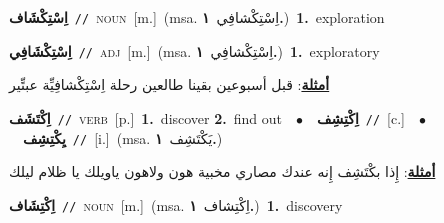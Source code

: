 \documentclass[10pt,a4paper,twoside]{article} %
\begin{document}
\begin{multicols}{2}
{\setlength\topsep{0pt}\textbf{\foreignlanguage{arabic}{اِسْتِكْشَاف}}\ {\color{gray}\texttt{//}\color{black}}\ \textsc{noun}\ [m.]\ \color{gray}(msa. \foreignlanguage{arabic}{اِسْتِكْشافِي}~\foreignlanguage{arabic}{\textbf{١.}})\color{black}\ \textbf{1.}~exploration\ } \vspace{2mm}

{\setlength\topsep{0pt}\textbf{\foreignlanguage{arabic}{اِسْتِكْشَافِي}}\ {\color{gray}\texttt{//}\color{black}}\ \textsc{adj}\ [m.]\ \color{gray}(msa. \foreignlanguage{arabic}{اِسْتِكْشافِي}~\foreignlanguage{arabic}{\textbf{١.}})\color{black}\ \textbf{1.}~exploratory\  \begin{flushright}\color{gray}\foreignlanguage{arabic}{\textbf{\underline{\foreignlanguage{arabic}{أمثلة}}}: قبل أسبوعين بقينا طالعين رحلة اِسْتِكْشافِيِّة عبتِّير}\end{flushright}\color{black}} \vspace{2mm}

{\setlength\topsep{0pt}\textbf{\foreignlanguage{arabic}{اِكْتَشَف}}\ {\color{gray}\texttt{//}\color{black}}\ \textsc{verb}\ [p.]\ \textbf{1.}~discover  \textbf{2.}~find out\ \ $\bullet$\ \ \setlength\topsep{0pt}\textbf{\foreignlanguage{arabic}{اِكْتِشِف}}\ {\color{gray}\texttt{//}\color{black}}\ [c.]\ \ $\bullet$\ \ \setlength\topsep{0pt}\textbf{\foreignlanguage{arabic}{يِكْتِشِف}}\ {\color{gray}\texttt{//}\color{black}}\ [i.]\ \color{gray}(msa. \foreignlanguage{arabic}{يَكْتَشِف}~\foreignlanguage{arabic}{\textbf{١.}})\color{black}\  \begin{flushright}\color{gray}\foreignlanguage{arabic}{\textbf{\underline{\foreignlanguage{arabic}{أمثلة}}}: إِذا بكْتَشِف إِنه عندك مصاري مخبية هون ولاهون ياويلك يا ظلام ليلك}\end{flushright}\color{black}} \vspace{2mm}

{\setlength\topsep{0pt}\textbf{\foreignlanguage{arabic}{اِكْتِشَاف}}\ {\color{gray}\texttt{//}\color{black}}\ \textsc{noun}\ [m.]\ \color{gray}(msa. \foreignlanguage{arabic}{اِكْتِشاف}~\foreignlanguage{arabic}{\textbf{١.}})\color{black}\ \textbf{1.}~discovery\ } \vspace{2mm}


\end{multicols}
\end{document}

